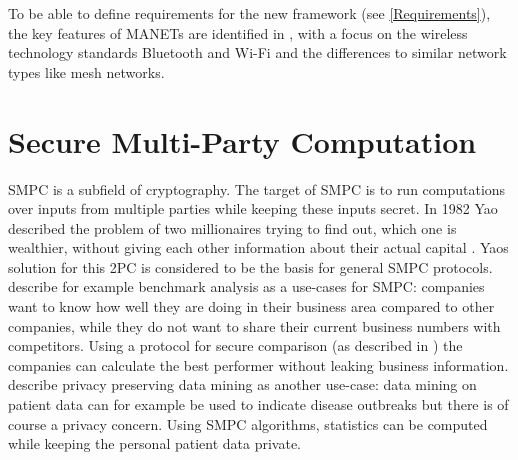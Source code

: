 To be able to define requirements for the new framework (see \ref{Requirements}), the key features of \glspl{MANET} are identified in , with a focus on the wireless technology standards Bluetooth and Wi-Fi and the differences to similar network types like mesh networks.


\section{Secure Multi-Party Computation} \label{Secure Multi-Party Computation}

\gls{SMPC} is a subfield of cryptography. The target of \gls{SMPC} is to run computations over inputs from multiple parties while keeping these inputs secret. In 1982 Yao described the problem of two millionaires trying to find out, which one is wealthier, without giving each other information about their actual capital \autocite{Yao1982}. Yaos solution for this \gls{2PC} is considered to be the basis for general \gls{SMPC} protocols.
\textcite{Cramer2015} describe for example benchmark analysis as a use-cases for \gls{SMPC}: companies want to know how well they are doing in their business area compared to other companies, while they do not want to share their current business numbers with competitors. Using a protocol for secure comparison (as described in ) the companies can calculate the best performer without leaking business information. 
\textcite{Clifton2002} describe privacy preserving data mining as another use-case: data mining on patient data can for example be used to indicate disease outbreaks but there is of course a privacy concern. Using \gls{SMPC} algorithms, statistics can be computed while keeping the personal patient data private.

